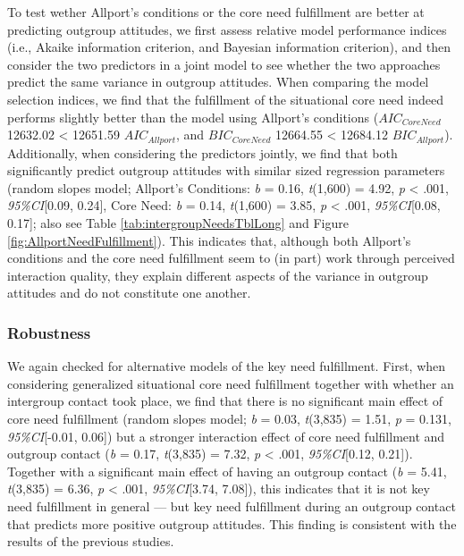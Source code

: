 To test wether Allport's conditions or the core need fulfillment are
better at predicting outgroup attitudes, we first assess relative model
performance indices (i.e., Akaike information criterion, and Bayesian
information criterion), and then consider the two predictors in a joint
model to see whether the two approaches predict the same variance in
outgroup attitudes. When comparing the model selection indices, we find
that the fulfillment of the situational core need indeed performs
slightly better than the model using Allport's conditions
(\(AIC_{CoreNeed}\) 12632.02 \textless{} 12651.59 \(AIC_{Allport}\), and
\(BIC_{CoreNeed}\) 12664.55 \textless{} 12684.12 \(BIC_{Allport}\)).
Additionally, when considering the predictors jointly, we find that both
significantly predict outgroup attitudes with similar sized regression
parameters (random slopes model; Allport's Conditions: \textit{b} =
0.16, \textit{t}(1,600) = 4.92, \textit{p} \textless{} .001,
\textit{95\%CI}{[}0.09, 0.24{]}, Core Need: \textit{b} = 0.14,
\textit{t}(1,600) = 3.85, \textit{p} \textless{} .001,
\textit{95\%CI}{[}0.08, 0.17{]}; also see Table
\ref{tab:intergroupNeedsTblLong} and Figure
\ref{fig:AllportNeedFulfillment}). This indicates that, although both
Allport's conditions and the core need fulfillment seem to (in part)
work through perceived interaction quality, they explain different
aspects of the variance in outgroup attitudes and do not constitute one
another.

\subsubsection{Robustness}

We again checked for alternative models of the key need fulfillment.
First, when considering generalized situational core need fulfillment
together with whether an intergroup contact took place, we find that
there is no significant main effect of core need fulfillment (random
slopes model; \textit{b} = 0.03, \textit{t}(3,835) = 1.51, \textit{p} =
0.131, \textit{95\%CI}{[}-0.01, 0.06{]}) but a stronger interaction
effect of core need fulfillment and outgroup contact (\textit{b} = 0.17,
\textit{t}(3,835) = 7.32, \textit{p} \textless{} .001,
\textit{95\%CI}{[}0.12, 0.21{]}). Together with a significant main
effect of having an outgroup contact (\textit{b} = 5.41,
\textit{t}(3,835) = 6.36, \textit{p} \textless{} .001,
\textit{95\%CI}{[}3.74, 7.08{]}), this indicates that it is not key need
fulfillment in general --- but key need fulfillment during an outgroup
contact that predicts more positive outgroup attitudes. This finding is
consistent with the results of the previous studies.

